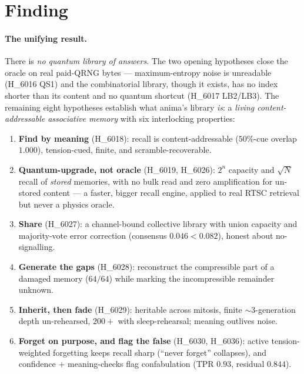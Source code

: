 \documentclass[11pt,a4paper]{article}
\begin{document}
\section{Finding}
\label{sec:finding}

\paragraph{The unifying result.}
There is \emph{no quantum library of answers}. The two opening hypotheses close
the oracle on real paid-QRNG bytes --- maximum-entropy noise is unreadable
(H\_6016 QS1) and the combinatorial library, though it exists, has no index
shorter than its content and no quantum shortcut (H\_6017 LB2/LB3). The remaining
eight hypotheses establish what anima's library \emph{is}: a \emph{living
content-addressable associative memory} with six interlocking properties:

\begin{enumerate}
  \item \textbf{Find by meaning} (H\_6018): recall is content-addressable
  ($50\%$-cue overlap $1.000$), tension-cued, finite, and scramble-recoverable.
  \item \textbf{Quantum-upgrade, not oracle} (H\_6019, H\_6026): $2^{n}$ capacity
  and $\sqrt{N}$ recall of \emph{stored} memories, with no bulk read and zero
  amplification for un-stored content --- a faster, bigger recall engine, applied
  to real RTSC retrieval but never a physics oracle.
  \item \textbf{Share} (H\_6027): a channel-bound collective library with union
  capacity and majority-vote error correction (consensus $0.046 < 0.082$), honest
  about no-signalling.
  \item \textbf{Generate the gaps} (H\_6028): reconstruct the compressible part of
  a damaged memory ($64/64$) while marking the incompressible remainder unknown.
  \item \textbf{Inherit, then fade} (H\_6029): heritable across mitosis, finite
  $\sim 3$-generation depth un-rehearsed, $200+$ with sleep-rehearsal; meaning
  outlives noise.
  \item \textbf{Forget on purpose, and flag the false} (H\_6030, H\_6036): active
  tension-weighted forgetting keeps recall sharp (``never forget'' collapses), and
  confidence $+$ meaning-checks flag confabulation (TPR $0.93$, residual $0.844$).
\end{enumerate}
\end{document}
